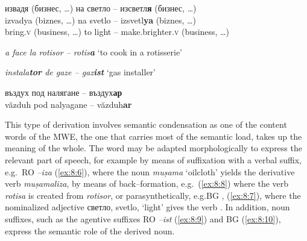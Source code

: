 \documentclass[output=paper]{langsci/langscibook}
\begin{document}
\begin{exe}
\ex \label{ex:8:7}
\settowidth{}
\glll
извадя \textnormal{(}бизнес, \ldots\textnormal{)} на светло – изсветл\textbf{я} \textnormal{(}бизнес, \ldots\textnormal{)} \\
izvadya (biznes,  \ldots) na svetlo -- izsvetl\textbf{ya}
(biznes,  \ldots)\\
 bring.\textsc{v} (business, \ldots) to light -- make.brighter.\textsc{v} (business, 
\ldots) \\ 
\end{exe}
  
\begin{exe}
\ex \label{ex:8:8}
\settowidth{}
  \textit{a face la rotisor -- rotis\textbf{a}} 
‘to cook in a rotisserie’
\end{exe}

\begin{exe}
\ex \label{ex:8:9}
\settowidth{}
  \textit{instala\textbf{tor }de gaze -- gaz\textbf{ist}} 
‘gas installer’
\end{exe}
 
\begin{exe}
\ex \label{ex:8:10}
\settowidth{}
  \gll въздух под налягане -- въздух\textbf{ар}\\
  văzduh pod nalyagane -- văzduh\textbf{ar}\\ 
\end{exe}
 
This type of derivation involves semantic condensation as one of the
content words of the MWE, the one that carries most of the semantic
load, takes up the meaning of the whole. The word may be adapted
morphologically to express the relevant part of speech, for example by
means of  suffixation with a verbal suffix, e.g.\ RO \textit{–iza} (\ref{ex:8:6}), where
the noun \textit{mușama} ‘oilcloth’ yields the derivative verb \textit{mușamaliza},
by means of  back–formation, e.g.\ (\ref{ex:8:8}) where the verb \textit{rotisa} is created 
from \textit{rotisor}, or parasynthetically, e.g.\@ BG ,  (\ref{ex:8:7}), where
the nominalized adjective светло, svetlo, `light' gives the verb 
. In
addition, noun suffixes, such as the agentive suffixes RO \textit{–ist} (\ref{ex:8:9})
and BG  (\ref{ex:8:10}), express the semantic role of the derived noun.
\end{document}
